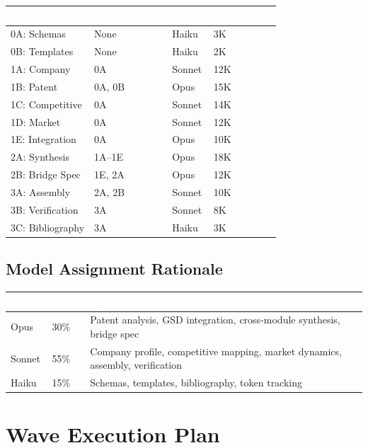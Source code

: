 \documentclass[11pt,letterpaper]{article}
\newcommand{\tableheader}[1]{\textbf{\sffamily\textcolor{white}{#1}}}
\begin{document}
\begin{center}
\begin{tabularx}{\textwidth}{L{2.2cm}L{3cm}C{1.5cm}C{1.5cm}}
\toprule
{}
\tableheader{Component} & \tableheader{Dependencies} & \tableheader{Model} & \tableheader{Est. Tokens} \\
\midrule
0A: Schemas & None & Haiku & 3K \\
0B: Templates & None & Haiku & 2K \\
1A: Company & 0A & Sonnet & 12K \\
1B: Patent & 0A, 0B & Opus & 15K \\
1C: Competitive & 0A & Sonnet & 14K \\
1D: Market & 0A & Sonnet & 12K \\
1E: Integration & 0A & Opus & 10K \\
2A: Synthesis & 1A--1E & Opus & 18K \\
2B: Bridge Spec & 1E, 2A & Opus & 12K \\
3A: Assembly & 2A, 2B & Sonnet & 10K \\
3B: Verification & 3A & Sonnet & 8K \\
3C: Bibliography & 3A & Haiku & 3K \\
\bottomrule
\end{tabularx}
\end{center}

\subsection{Model Assignment Rationale}

\begin{center}
\begin{tabularx}{\textwidth}{C{1.5cm}C{1.5cm}X}
\toprule
{}
\tableheader{Model} & \tableheader{Share} & \tableheader{Tasks} \\
\midrule
Opus & 30\% & Patent analysis, GSD integration, cross-module synthesis, bridge spec \\
Sonnet & 55\% & Company profile, competitive mapping, market dynamics, assembly, verification \\
Haiku & 15\% & Schemas, templates, bibliography, token tracking \\
\bottomrule
\end{tabularx}
\end{center}

\section{Wave Execution Plan}
\end{document}
